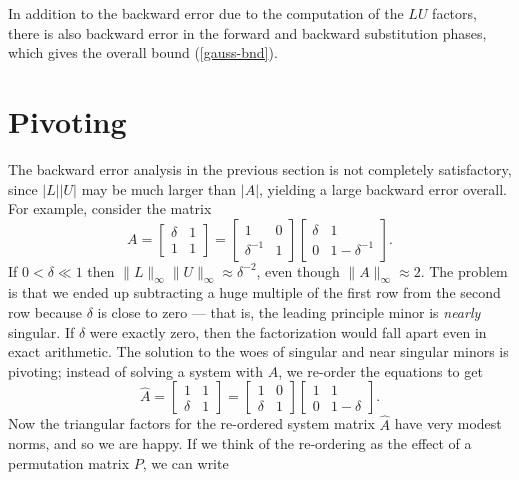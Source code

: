 \documentclass[12pt, leqno]{article}
\begin{document}
In addition to the backward error due to the computation of the $LU$
factors, there is also backward error in the forward and backward
substitution phases, which gives the overall bound (\ref{gauss-bnd}).

\section*{Pivoting}


The backward error analysis in the previous section is not completely
satisfactory, since $|L| |U|$ may be much larger than $|A|$, yielding
a large backward error overall.  For example, consider the matrix
\[
  A = \begin{bmatrix} \delta & 1 \\ 1 & 1 \end{bmatrix} =
      \begin{bmatrix} 1 & 0 \\ \delta^{-1} & 1 \end{bmatrix}
      \begin{bmatrix} \delta & 1 \\ 0 & 1-\delta^{-1} \end{bmatrix}.
\]
If $0 < \delta \ll 1$ then $\|L\|_{\infty} \|U\|_{\infty} \approx
\delta^{-2}$, even though $\|A\|_{\infty} \approx 2$.  The problem is
that we ended up subtracting a huge multiple of the first row from the
second row because $\delta$ is close to zero --- that is, the leading
principle minor is {\em nearly} singular.  If $\delta$ were exactly
zero, then the factorization would fall apart even in exact
arithmetic.  The solution to the woes of singular and near singular minors
is pivoting; instead of solving a system with $A$, we re-order the
equations to get
\[
  \hat{A} = 
      \begin{bmatrix} 1 & 1 \\ \delta & 1 \end{bmatrix} =
      \begin{bmatrix} 1 & 0 \\ \delta & 1 \end{bmatrix}
      \begin{bmatrix} 1 & 1 \\ 0 & 1-\delta \end{bmatrix}.
\]
Now the triangular factors for the re-ordered system matrix $\hat{A}$
have very modest norms, and so we are happy.  If we think of the re-ordering
as the effect of a permutation matrix $P$, we can write
\end{document}
